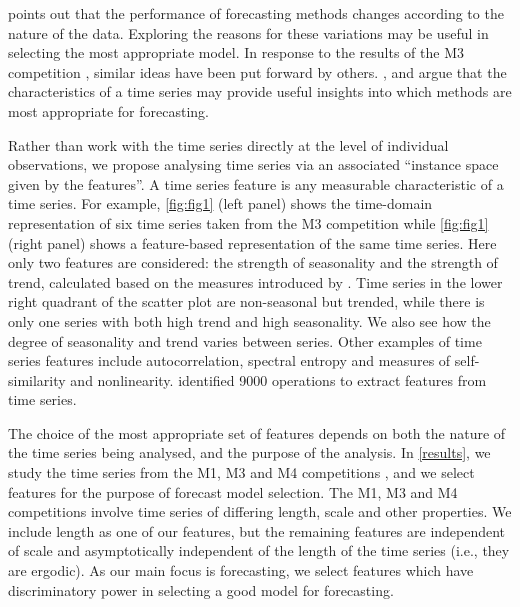 \documentclass[11pt,a4paper,]{article}
\begin{document}
\textcite{reid1972comparison} points out that the performance of forecasting methods changes according to the nature of the data. Exploring the reasons for these variations may be useful in selecting the most appropriate model. In response to the results of the M3 competition \autocite{makridakis2000m3}, similar ideas have been put forward by others. \textcite{hyndman2001s}, \textcite{lawrence2001s} and \textcite{armstrong2001s} argue that the characteristics of a time series may provide useful insights into which methods are most appropriate for forecasting.

Rather than work with the time series directly at the level of individual observations, we propose analysing time series via an associated ``instance space given by the features''. A time series feature is any measurable characteristic of a time series. For example, \autoref{fig:fig1} (left panel) shows the time-domain representation of six time series taken from the M3 competition \autocite{makridakis2000m3} while \autoref{fig:fig1} (right panel) shows a feature-based representation of the same time series. Here only two features are considered: the strength of seasonality and the strength of trend, calculated based on the measures introduced by \textcite{wang2009rule}. Time series in the lower right quadrant of the scatter plot are non-seasonal but trended, while there is only one series with both high trend and high seasonality. We also see how the degree of seasonality and trend varies between series. Other examples of time series features include autocorrelation, spectral entropy and measures of self-similarity and nonlinearity. \textcite{fulcher2014highly} identified 9000 operations to extract features from time series.

The choice of the most appropriate set of features depends on both the nature of the time series being analysed, and the purpose of the analysis. In \autoref{results}, we study the time series from the M1, M3 and M4 competitions \autocites{makridakis1982accuracy}{makridakis2000m3}{makridakis2019m4}, and we select features for the purpose of forecast model selection. The M1, M3 and M4 competitions involve time series of differing length, scale and other properties. We include length as one of our features, but the remaining features are independent of scale and asymptotically independent of the length of the time series (i.e., they are ergodic). As our main focus is forecasting, we select features which have discriminatory power in selecting a good model for forecasting.
\end{document}

